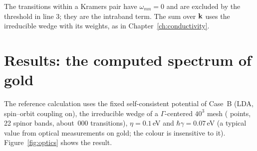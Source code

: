 The transitions within a Kramers pair have $\omega_{mn} = 0$ and are
excluded by the threshold in line 3; they are the intraband term. The
sum over $\mathbf{k}$ uses the irreducible wedge with its weights, as in
Chapter~\ref{ch:conductivity}.

\section{Results: the computed spectrum of gold}
\label{sec:colourresults}

The reference calculation uses the fixed self-consistent potential of
Case~B (LDA, spin--orbit coupling on), the irreducible wedge of a
$\Gamma$-centered $40^3$ mesh (\NKFINE{} points, 22 spinor bands, about
\NTRANS\,000 transitions), $\eta = 0.1$\,eV and $\hbar\gamma = 0.07$\,eV
(a typical value from optical measurements on gold; the colour is
insensitive to it). Figure~\ref{fig:optics} shows the result.

